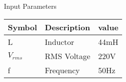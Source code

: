 \setlength{\arrayrulewidth}{0.3mm}
\setlength{\tabcolsep}{12pt}
\renewcommand{\arraystretch}{1.3}


\begin{center}
\caption{Input Parameters}
\begin{tabular}{ |p{1.7cm}|p{1.7cm}|p{1.7cm}|  }

\hline
 {Symbol}&{Description} & {value}\\
\hline
L & Inductor & 44mH\\
\hline
$V_{rms}$ & RMS Voltage  & 220V\\
\hline
f & Frequency & 50Hz \\
\hline

\end{tabular}
\end{center}
